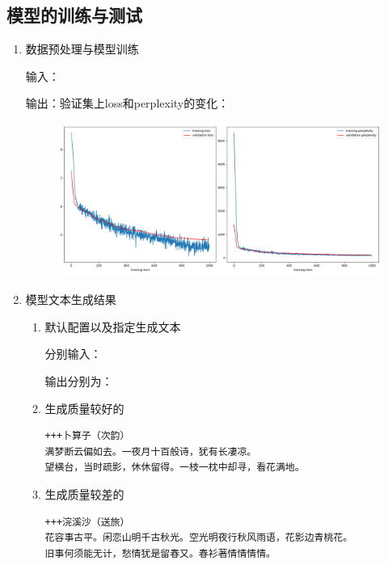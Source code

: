 \documentclass[a4paper]{article}
\begin{document}
\subsection{模型的训练与测试}
\begin{enumerate}
    \item 数据预处理与模型训练
    
    输入：
    

    输出：验证集上loss和perplexity的变化：
    \begin{figure}[H]
        \centering
        \includegraphics[width=0.9\linewidth]{../img/1.png}
    \end{figure}


    \item 模型文本生成结果
    
    \begin{enumerate}
        \item 默认配置以及指定生成文本
        
        分别输入：
        

        输出分别为：
        

        \item 生成质量较好的
        
        \begin{lstlisting}
+++卜算子（次韵）
满梦断云偏如去。一夜月十百般诗，犹有长凄凉。
望横台，当时疏影，休休留得。一枝一枕中却寻，看花满地。
        \end{lstlisting}

        \item 生成质量较差的
        
        \begin{lstlisting}
+++浣溪沙（送旅）
花容事古平。闲恋山明千古秋光。空光明夜行秋风雨语，花影边青桃花。
旧事何须能无计，愁情犹是留春又。春衫著情情情情。
        \end{lstlisting}
    \end{enumerate}
\end{enumerate}
\end{document}
